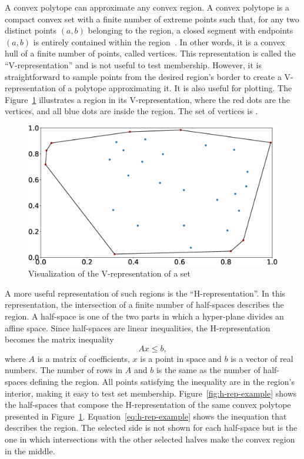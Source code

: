 A convex polytope can approximate any convex region. A convex polytope is a
compact convex set with a finite number of extreme points such that, for any two
distinct points \((a,b)\) belonging to the region, a closed segment with
endpoints \((a,b)\) is entirely contained within the
region~\parencite{grünbaum:convex}. In other words, it is a convex hull of a
finite number of points, called vertices. This representation is called the
\enquote{V-representation} and is not useful to test membership. However, it is
straightforward to sample points from the desired region's border to create a
V-representation of a polytope approximating it. It is also useful for plotting.
The Figure~\ref{fig:v-rep-example} illustrates a region in its V-representation,
where the red dots are the vertices, and all blue dots are inside the region.
The set of vertices is .

\begin{figure}[!htb]
  \centering
  \includegraphics[width=\linewidth]{imgs/v-rep}
  \caption{Visualization of the V-representation of a set}%
  \label{fig:v-rep-example}
\end{figure}

A more useful representation of such regions is the \enquote{H-representation}.
In this representation, the intersection of a finite number of half-spaces
describes the region. A half-space is one of the two parts in which a
hyper-plane divides an affine space. Since half-spaces are linear inequalities,
the H-representation becomes the matrix inequality
%
\begin{equation}
  Ax\leq{}b,
\end{equation}
%
where \(A\) is a matrix of coefficients, \(x\) is a point in space and \(b\) is
a vector of real numbers. The number of rows in \(A\) and \(b\) is the same as
the number of half-spaces defining the region. All points satisfying the
inequality are in the region's interior, making it easy to test set membership.
Figure~\ref{fig:h-rep-example} shows the half-spaces that compose the
H-representation of the same convex polytope presented in
Figure~\ref{fig:v-rep-example}. Equation~\ref{eq:h-rep-example} shows the
inequation that describes the region. The selected side is not shown for each
half-space but is the one in which intersections with the other selected halves
make the convex region in the middle.

